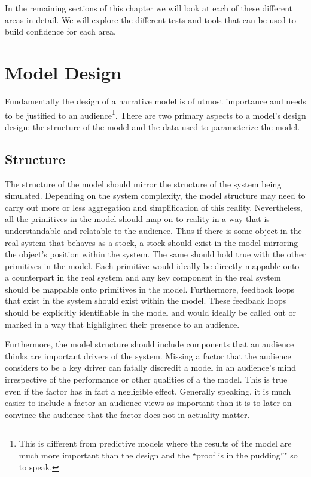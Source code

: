 \documentclass[]{memoir}
\begin{document}
In the remaining sections of this chapter we will look at each of these
different areas in detail. We will explore the different tests and tools
that can be used to build confidence for each area.

\section{Model Design}

Fundamentally the design of a narrative model is of utmost importance
and needs to be justified to an audience\footnote{This is different from
  predictive models where the results of the model are much more
  important than the design and the ``proof is in the pudding''" so to
  speak.}. There are two primary aspects to a model's design design: the
structure of the model and the data used to parameterize the model.

\subsection{Structure}

The structure of the model should mirror the structure of the system
being simulated. Depending on the system complexity, the model structure
may need to carry out more or less aggregation and simplification of
this reality. Nevertheless, all the primitives in the model should map
on to reality in a way that is understandable and relatable to the
audience. Thus if there is some object in the real system that behaves
as a stock, a stock should exist in the model mirroring the object's
position within the system. The same should hold true with the other
primitives in the model. Each primitive would ideally be directly
mappable onto a counterpart in the real system and any key component in
the real system should be mappable onto primitives in the model.
Furthermore, feedback loops that exist in the system should exist within
the model. These feedback loops should be explicitly identifiable in the
model and would ideally be called out or marked in a way that
highlighted their presence to an audience.

Furthermore, the model structure should include components that an
audience thinks are important drivers of the system. Missing a factor
that the audience considers to be a key driver can fatally discredit a
model in an audience's mind irrespective of the performance or other
qualities of a the model. This is true even if the factor has in fact a
negligible effect. Generally speaking, it is much easier to include a
factor an audience views as important than it is to later on convince
the audience that the factor does not in actuality matter.
\end{document}
